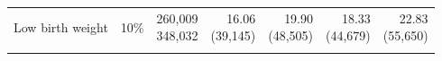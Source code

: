 \begin{table}[htbp]
\begin{tabular*}{\linewidth}{@{\extracolsep{\fill}}lccrrrr@{}}
\addlinespace[3pt]
Low birth weight & 10\% & \shortstack{260,009\\348,032} & \shortstack[r]{16.06\\(39,145)} & \shortstack[r]{19.90\\(48,505)} & \shortstack[r]{18.33\\(44,679)} & \shortstack[r]{22.83\\(55,650)} \\
\addlinespace[3pt]
\bottomrule
\end{tabular*}
\end{table}
